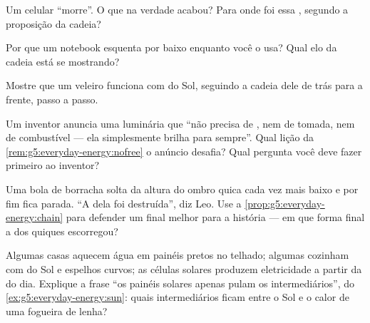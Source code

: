 \begin{exercise}[$\star$]\label{exo:g5:everyday-energy:6}
Um celular ``morre''. O que na verdade acabou? Para onde foi essa
, segundo a proposição da cadeia?
\end{exercise}

\begin{exercise}[$\star$]\label{exo:g5:everyday-energy:7}
Por que um notebook esquenta por baixo enquanto você o usa? Qual elo
da cadeia está se mostrando?
\end{exercise}

\begin{exercise}[$\star$]\label{exo:g5:everyday-energy:8}
Mostre que um veleiro funciona com  do Sol, seguindo a cadeia dele
de trás para a frente, passo a passo.
\end{exercise}

\begin{exercise}[$\star\star$]\label{exo:g5:everyday-energy:9}
Um inventor anuncia uma luminária que ``não precisa de , nem de
tomada, nem de combustível --- ela simplesmente brilha para
sempre''. Qual lição da \cref{rem:g5:everyday-energy:nofree} o
anúncio desafia? Qual pergunta você deve fazer primeiro ao inventor?
\end{exercise}

\begin{exercise}[$\star\star$]\label{exo:g5:everyday-energy:10}
Uma bola de borracha solta da altura do ombro quica cada vez mais
baixo e por fim fica parada. ``A  dela foi destruída'', diz
Leo. Use a \cref{prop:g5:everyday-energy:chain} para defender um
final melhor para a história --- em que forma final a  dos
quiques escorregou?
\end{exercise}

\begin{exercise}[$\star\star$]\label{exo:g5:everyday-energy:11}
Algumas casas aquecem água em painéis pretos no telhado; algumas
cozinham com  do Sol e espelhos curvos; as células solares
produzem eletricidade a partir da  do dia. Explique a frase ``os
painéis solares apenas pulam os intermediários'', do
\cref{ex:g5:everyday-energy:sun}: quais intermediários ficam entre o
Sol e o calor de uma fogueira de lenha?
\end{exercise}
